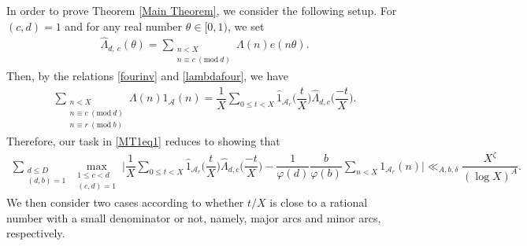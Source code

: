 \documentclass[12pt]{amsart}
\numberwithin{equation}{section}
\theoremstyle{remark}
\theoremstyle{definition}
\newcommand{\imod}[1]{\ (\mathrm{mod}\ #1)}
\begin{document}
In order to prove Theorem \ref{Main Theorem}, we consider the following setup. For $(c, d)=1$ and for any real number $\theta\in [0, 1)$, we set  
\begin{align}\label{lambdafour}
\widehat{\Lambda}_{d,\: c}(\theta)=\sum_{\substack{n<X\\n\equiv c\imod {d}}}\Lambda(n)e(n\theta).
\end{align}
Then, by the relations \eqref{fourinv} and \eqref{lambdafour}, we have
\begin{align}
\sum_{\substack{n<X\\n\equiv c\imod {d}\\n\equiv r\imod b}}\Lambda(n)1_{\mathcal{A}}(n) = \dfrac{1}{X}\sum_{0\leq t<X}\widehat{1}_{\mathcal{A}_r}\bigg(\dfrac{t}{X}\bigg)\widehat{\Lambda}_{d, c}\bigg(\dfrac{-t}{X}\bigg).
\end{align}
Therefore, our task in \eqref{MT1eq1} reduces to showing that
\begin{align}
\label{Mainsum}\sum_{\substack{d\leq D\\(d, b)=1}}\max_{\substack{1\leq c<d\\(c, d)=1}}\bigg|\dfrac{1}{X}\sum_{0\leq t<X}\widehat{1}_{\mathcal{A}_r}\bigg(\dfrac{t}{X}\bigg)\widehat{\Lambda}_{d, c}\bigg(\dfrac{-t}{X}\bigg) - \dfrac{1}{\varphi(d)}\dfrac{b}{\varphi(b)}\sum_{n<X}1_{\mathcal{A}_r}(n)\bigg|\ll_{A, b, \delta}\dfrac{X^\zeta}{(\log X)^A}.
\end{align}
We then consider two cases according to whether $t/X$ is close to a rational number with a small denominator or not, namely, major arcs and minor arcs, respectively.

\medskip
\end{document}
